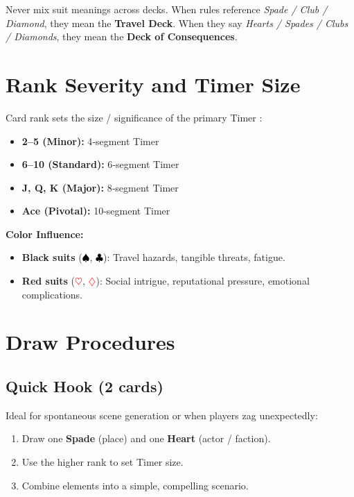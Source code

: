 \begin{tcolorbox}[title=Important, colback=red!5!white, colframe=red!75!black]
Never mix suit meanings across decks. When rules reference \emph{Spade / Club / Diamond}, they mean the \textbf{Travel Deck}. When they say \emph{Hearts / Spades / Clubs / Diamonds}, they mean the \textbf{Deck of Consequences}.
\end{tcolorbox}

\section{Rank Severity and Timer Size}\label{sec:rank_severity}

Card rank sets the size / significance of the primary Timer :

\begin{itemize}
    \item \textbf{2--5 (Minor):}  4‑segment Timer 
    \item \textbf{6--10 (Standard):} 6‑segment Timer 
    \item \textbf{J, Q, K (Major):} 8‑segment Timer 
    \item \textbf{Ace (Pivotal):} 10‑segment Timer 
\end{itemize}

\noindent \textbf{Color Influence:}
\begin{itemize}
    \item \textbf{Black suits} (\textcolor{black}{$\spadesuit$}, \textcolor{black}{$\clubsuit$}): Travel hazards, tangible threats, fatigue. 
    \item \textbf{Red suits} (\textcolor{red}{$\heartsuit$}, \textcolor{red}{$\diamondsuit$}): Social intrigue, reputational pressure, emotional complications. 
\end{itemize}

\section{Draw Procedures}\label{sec:draw_procedures}

\subsection{Quick Hook (2 cards)}\label{subsec:quick_hook}
Ideal for spontaneous scene generation or when players zag unexpectedly:
\begin{enumerate}
    \item Draw one \textbf{Spade} (place) and one \textbf{Heart} (actor / faction).
    \item Use the higher rank to set Timer size.
    \item Combine elements into a simple, compelling scenario.
\end{enumerate}

